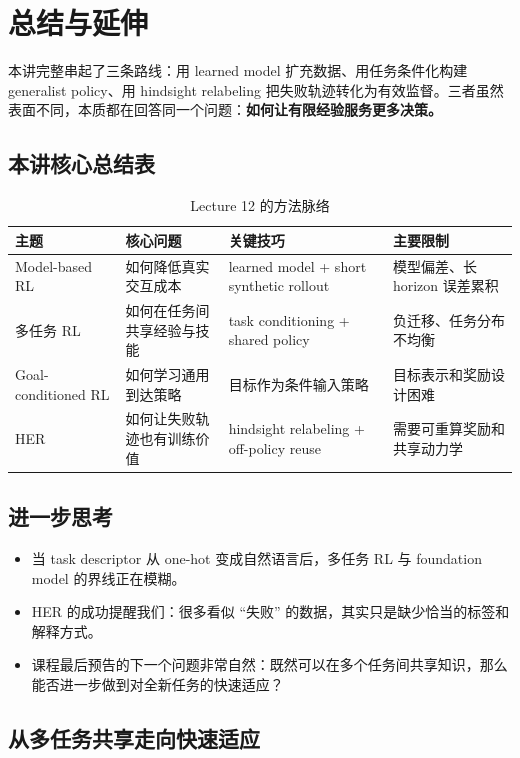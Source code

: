\section{总结与延伸}

本讲完整串起了三条路线：用 learned model 扩充数据、用任务条件化构建 generalist policy、用 hindsight relabeling 把失败轨迹转化为有效监督。三者虽然表面不同，本质都在回答同一个问题：\textbf{如何让有限经验服务更多决策。}

\subsection{本讲核心总结表}

\begin{table}[H]
\centering
\begin{tabular}{p{} p{} p{} p{}}
\toprule
主题 & 核心问题 & 关键技巧 & 主要限制 \\
\midrule
Model-based RL & 如何降低真实交互成本 & learned model + short synthetic rollout & 模型偏差、长 horizon 误差累积 \\
多任务 RL & 如何在任务间共享经验与技能 & task conditioning + shared policy & 负迁移、任务分布不均衡 \\
Goal-conditioned RL & 如何学习通用到达策略 & 目标作为条件输入策略 & 目标表示和奖励设计困难 \\
HER & 如何让失败轨迹也有训练价值 & hindsight relabeling + off-policy reuse & 需要可重算奖励和共享动力学 \\
\bottomrule
\end{tabular}
\caption{Lecture 12 的方法脉络}
\end{table}

\subsection{进一步思考}

\begin{itemize}
    \item 当 task descriptor 从 one-hot 变成自然语言后，多任务 RL 与 foundation model 的界线正在模糊。
    \item HER 的成功提醒我们：很多看似 ``失败'' 的数据，其实只是缺少恰当的标签和解释方式。
    \item 课程最后预告的下一个问题非常自然：既然可以在多个任务间共享知识，那么能否进一步做到对全新任务的快速适应？
\end{itemize}

\subsection{从多任务共享走向快速适应}

